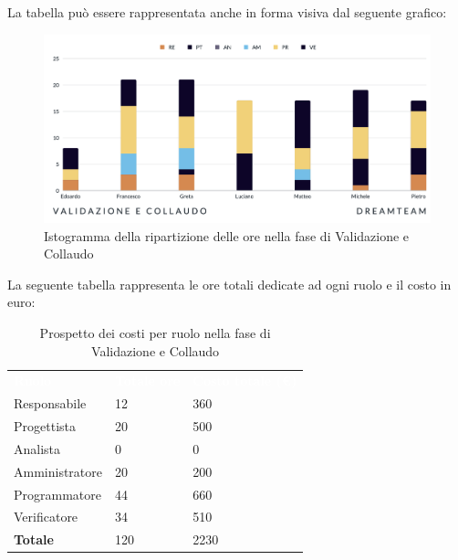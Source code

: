 La tabella può essere rappresentata anche in forma visiva dal seguente grafico:
\begin{figure}[H]
\centering
\includegraphics[scale=0.50]{Sezioni/SezioniPreventivo/grafici/validazione/Validazione_collaudo.png}
\caption{Istogramma della ripartizione delle ore nella fase di Validazione e Collaudo}
\end{figure}

La seguente tabella rappresenta le ore totali dedicate ad ogni ruolo e il costo in euro:

\begin{table}[H]
\begin{center}
\renewcommand{\arraystretch}{1.5}
\begin{tabular}{ m{}<{\centering}  m{}<{\centering} m{}<{\centering}}
	\rowcolor{darkblue}
	\textcolor{white}{\textbf{Ruolo}}&\textcolor{white}{\textbf{Totale ore}}&\textcolor{white}{\textbf{Costo totale (\euro)}}\\ 

	Responsabile  & 12 & 360 \\	
	
	Progettista & 20 & 500 \\
	
	Analista & 0 & 0 \\

	Amministratore & 20 & 200 \\
	
	Programmatore & 44 & 660 \\
	
	Verificatore & 34 & 510 \\
	
	\textbf{Totale} & 120 & 2230 \\
	
\end{tabular}
\caption{Prospetto dei costi per ruolo nella fase di Validazione e Collaudo}
\end{center}
\end{table}

